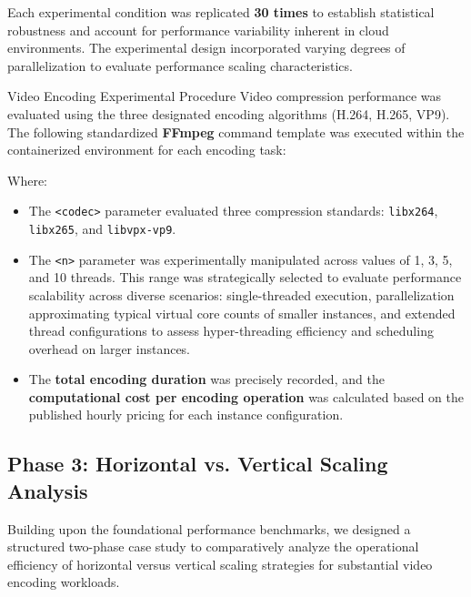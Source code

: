 \documentclass[conference]{IEEEtran}
\begin{document}
	Each experimental condition was replicated \textbf{30 times} to establish statistical robustness and account for performance variability inherent in cloud environments. The experimental design incorporated varying degrees of parallelization to evaluate performance scaling characteristics.
	
	Video Encoding Experimental Procedure
	Video compression performance was evaluated using the three designated encoding algorithms (H.264, H.265, VP9). The following standardized \textbf{FFmpeg} command template was executed within the containerized environment for each encoding task:
	\begin{center}
		{\ttfamily\scriptsize
		}
	\end{center}
	
	Where:
	\begin{itemize}
		\item The \texttt{<codec>} parameter evaluated three compression standards: \texttt{libx264}, \texttt{libx265}, and \texttt{libvpx-vp9}.
		\item The \texttt{<n>} parameter was experimentally manipulated across values of 1, 3, 5, and 10 threads. This range was strategically selected to evaluate performance scalability across diverse scenarios: single-threaded execution, parallelization approximating typical virtual core counts of smaller instances, and extended thread configurations to assess hyper-threading efficiency and scheduling overhead on larger instances.
		\item The \textbf{total encoding duration} was precisely recorded, and the \textbf{computational cost per encoding operation} was calculated based on the published hourly pricing for each instance configuration.
	\end{itemize}
	
	\subsection{Phase 3: Horizontal vs. Vertical Scaling Analysis}
	
	Building upon the foundational performance benchmarks, we designed a structured two-phase case study to comparatively analyze the operational efficiency of horizontal versus vertical scaling strategies for substantial video encoding workloads.
	
\end{document}

